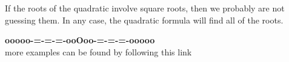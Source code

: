 \documentclass{ximera}
\begin{document}
If the roots of the quadratic involve square roots, then we probably are not guessing them.  In any case, the quadratic formula will find all of the roots.






















































\begin{onlineOnly}
\begin{center}
\textbf{\textcolor{green!50!black}{ooooo-=-=-=-ooOoo-=-=-=-ooooo}} \\

more examples can be found by following this link\\ 

\end{center}
\end{onlineOnly}
\end{document}
